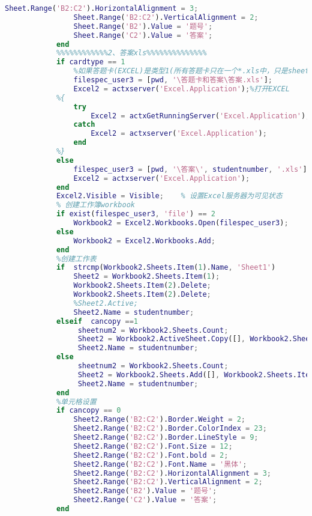 \begin{lstlisting}[language=Matlab]
                Sheet.Range('B2:C2').HorizontalAlignment = 3;
                Sheet.Range('B2:C2').VerticalAlignment = 2;
                Sheet.Range('B2').Value = '题号';
                Sheet.Range('C2').Value = '答案';
            end
            %%%%%%%%%%%%2、答案xls%%%%%%%%%%%%%%
            if cardtype == 1
                %如果答题卡(EXCEL)是类型1(所有答题卡只在一个*.xls中，只是sheet的名称为学号)
                filespec_user3 = [pwd, '\答题卡和答案\答案.xls'];
                Excel2 = actxserver('Excel.Application');%打开EXCEL
            %{
                try
                    Excel2 = actxGetRunningServer('Excel.Application');
                catch
                    Excel2 = actxserver('Excel.Application');
                end
            %}
            else
                filespec_user3 = [pwd, '\答案\', studentnumber, '.xls'];
                Excel2 = actxserver('Excel.Application');
            end
            Excel2.Visible = Visible;    % 设置Excel服务器为可见状态
            % 创建工作簿workbook
            if exist(filespec_user3, 'file') == 2
                Workbook2 = Excel2.Workbooks.Open(filespec_user3);
            else
                Workbook2 = Excel2.Workbooks.Add;
            end
            %创建工作表
            if  strcmp(Workbook2.Sheets.Item(1).Name, 'Sheet1')
                Sheet2 = Workbook2.Sheets.Item(1);
                Workbook2.Sheets.Item(2).Delete;
                Workbook2.Sheets.Item(2).Delete;
                %Sheet2.Active;
                Sheet2.Name = studentnumber;
            elseif  cancopy ==1
                 sheetnum2 = Workbook2.Sheets.Count;
                 Sheet2 = Workbook2.ActiveSheet.Copy([], Workbook2.Sheets.Item(sheetnum2));
                 Sheet2.Name = studentnumber;
            else
                 sheetnum2 = Workbook2.Sheets.Count;
                 Sheet2 = Workbook2.Sheets.Add([], Workbook2.Sheets.Item(sheetnum2), 1, []);
                 Sheet2.Name = studentnumber;
            end
            %单元格设置
            if cancopy == 0
                Sheet2.Range('B2:C2').Border.Weight = 2;
                Sheet2.Range('B2:C2').Border.ColorIndex = 23;
                Sheet2.Range('B2:C2').Border.LineStyle = 9;
                Sheet2.Range('B2:C2').Font.Size = 12;
                Sheet2.Range('B2:C2').Font.bold = 2;
                Sheet2.Range('B2:C2').Font.Name = '黑体';
                Sheet2.Range('B2:C2').HorizontalAlignment = 3;
                Sheet2.Range('B2:C2').VerticalAlignment = 2;
                Sheet2.Range('B2').Value = '题号';
                Sheet2.Range('C2').Value = '答案';
            end
            \end{lstlisting}
